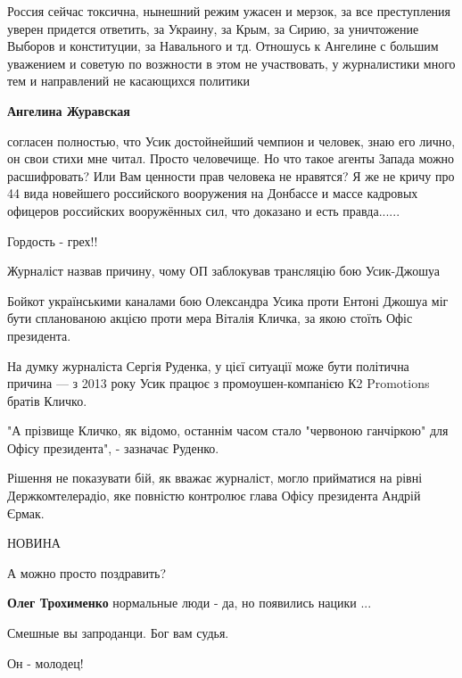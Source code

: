 \begin{itemize}
\begin{itemize}
Россия сейчас токсична, нынешний режим ужасен и мерзок, за все преступления
уверен придется ответить, за Украину, за Крым, за Сирию, за уничтожение Выборов
и конституции, за Навального и тд. Отношусь к Ангелине с большим уважением и
советую по возжности в этом не участвовать, у журналистики много тем и
направлений не касающихся политики


\textbf{Ангелина Журавская} 

согласен полностью, что Усик достойнейший чемпион и человек, знаю его лично, он
свои стихи мне читал. Просто человечище. Но что такое агенты Запада можно
расшифровать? Или Вам ценности прав человека не нравятся? Я же не кричу про 44
вида новейшего российского вооружения на Донбассе и массе кадровых офицеров
российских вооружённых сил, что доказано и есть правда......

\end{itemize} %

Гордость - грех!!


Журналіст назвав причину, чому ОП заблокував трансляцію бою Усик-Джошуа

Бойкот українськими каналами бою Олександра Усика проти Ентоні Джошуа міг бути
спланованою акцією проти мера Віталія Кличка, за якою стоїть Офіс президента.

На думку журналіста Сергія Руденка, у цієї ситуації може бути політична причина
— з 2013 року Усик працює з промоушен-компанією К2 Promotions братів Кличко.

"А прізвище Кличко, як відомо, останнім часом стало "червоною ганчіркою" для
Офісу президента", - зазначає Руденко.

Рішення не показувати бій, як вважає журналіст, могло прийматися на рівні
Держкомтелерадіо, яке повністю контролює глава Офісу президента Андрій Єрмак.

НОВИНА

А можно просто поздравить?

\begin{itemize} %
\textbf{Олег Трохименко} нормальные люди - да, но появились нацики ...
\end{itemize} %

Смешные вы запроданци. Бог вам судья.

Он - молодец!



\end{itemize}
